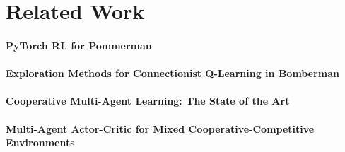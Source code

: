 \section{Related Work}



\paragraph{PyTorch RL for Pommerman}

\paragraph{Exploration Methods for Connectionist Q-Learning in Bomberman}

\paragraph{Cooperative Multi-Agent Learning: The State of the Art}

\paragraph{Multi-Agent Actor-Critic for Mixed Cooperative-Competitive Environments}